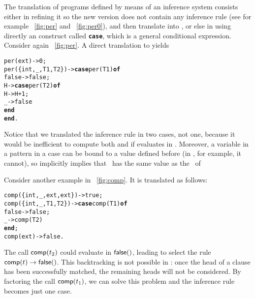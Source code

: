 The translation of programs defined by means of an inference system
consists either in refining it so the new version does not contain any
inference rule (see for example \fig~\vref{fig:per} and
\fig~\ref{fig:per0}), and then translate into \Erlang, or else in
using directly an \Erlang construct called \texttt{\textbf{case}},
which is a general conditional expression. Consider again
\fig~\vref{fig:per}. A direct translation to \Erlang yields
\begin{alltt}
per(ext)           -> 0;
per(\{int,\_,T1,T2\}) -> \textbf{case} per(T1) \textbf{of}
                        false -> false;
                            H -> \textbf{case} per(T2) \textbf{of}
                                   H -> H + 1;
                                   \_ -> false
                                 \textbf{end}
                      \textbf{end}.
\end{alltt}
Notice that we translated the inference rule in two cases, not one,
because it would be inefficient to compute both  and
 if  evaluates in
. Moreover, a variable in a pattern in a case can be
bound to a value defined before (in \OCaml, for example, it cannot),
so  implicitly
implies that~ has the same value as the~ of

Consider another example in \fig~\vref{fig:comp}. It is translated as follows:
\begin{alltt}
comp(\{int,\_,ext,ext\}) -> true;
comp(\{int,\_,T1,T2\})   -> \textbf{case} comp(T1) \textbf{of}
                           false -> false;
                               \_ -> comp(T2)
                         \textbf{end};
comp(ext)             -> false.
\end{alltt}
The call \(\textsf{comp}(t_2)\) could evaluate in \(\textsf{false}()\), leading to select the rule \(\textsf{comp}(t) \rightarrow \textsf{false}()\). This backtracking is not possible in \Erlang: once the head of a clause has been successfully matched, the remaining heads will not be considered. By factoring the call \(\textsf{comp}(t_1)\), we can solve this problem and the inference rule becomes just one case.

